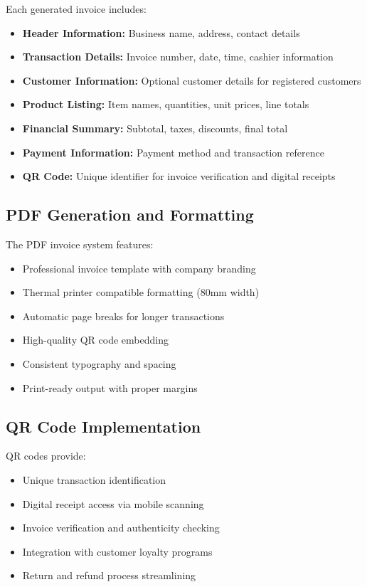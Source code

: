Each generated invoice includes:
\begin{itemize}
  \item \textbf{Header Information:} Business name, address, contact details
  \item \textbf{Transaction Details:} Invoice number, date, time, cashier information
  \item \textbf{Customer Information:} Optional customer details for registered customers
  \item \textbf{Product Listing:} Item names, quantities, unit prices, line totals
  \item \textbf{Financial Summary:} Subtotal, taxes, discounts, final total
  \item \textbf{Payment Information:} Payment method and transaction reference
  \item \textbf{QR Code:} Unique identifier for invoice verification and digital receipts
\end{itemize}

\subsection*{PDF Generation and Formatting}

The PDF invoice system features:
\begin{itemize}
  \item Professional invoice template with company branding
  \item Thermal printer compatible formatting (80mm width)
  \item Automatic page breaks for longer transactions
  \item High-quality QR code embedding
  \item Consistent typography and spacing
  \item Print-ready output with proper margins
\end{itemize}

\subsection*{QR Code Implementation}

QR codes provide:
\begin{itemize}
  \item Unique transaction identification
  \item Digital receipt access via mobile scanning
  \item Invoice verification and authenticity checking
  \item Integration with customer loyalty programs
  \item Return and refund process streamlining
\end{itemize}

